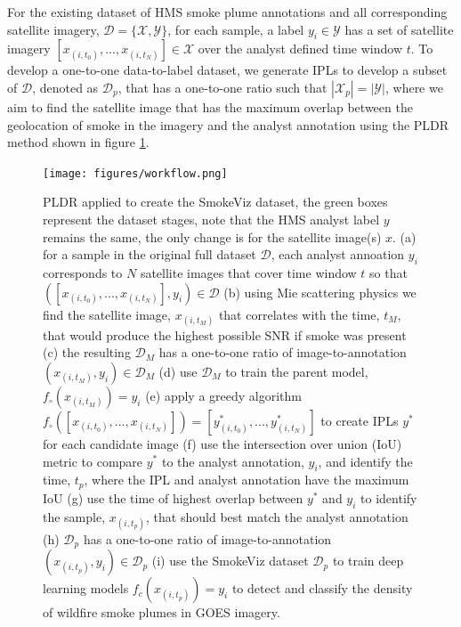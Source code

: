 \documentclass{article}
\begin{document}
For the existing dataset of HMS smoke plume annotations and all corresponding satellite imagery, \(\mathcal{D} = \{\mathcal{X}, \mathcal{Y}\}\), for each sample, a label \(y_i \in \mathcal{Y}\) has a set of satellite imagery \([x_{(i,t_0)},...,x_{(i,t_N)}] \in \mathcal{X}\) over the analyst defined time window \(t\). To develop a one-to-one data-to-label dataset, we generate IPLs to develop a subset of \(\mathcal{D}\), denoted as \(\mathcal{D}_p\), that has a one-to-one ratio such that \(|\mathcal{X}_p| = |\mathcal{Y}|\), where we aim to find the satellite image that has the maximum overlap between the geolocation of smoke in the imagery and the analyst annotation using the PLDR method shown in figure \ref{PLDR}.

\begin{figure}[!htb]
    \centering
    \texttt{[image: figures/workflow.png]}
    \caption{PLDR applied to create the SmokeViz dataset, the green boxes represent the dataset stages, note that the HMS analyst label \(y\) remains the same, the only change is for the satellite image(s) \(x\). (a) for a sample in the original full dataset \(\mathcal{D}\), each analyst annoation \(y_i\) corresponds to \(N\) satellite images that cover time window \(t\) so that \(([x_{(i,t_0)},...,x_{(i,t_N)}], y_i) \in \mathcal{D}\) (b) using Mie scattering physics we find the satellite image, \(x_{(i,t_M)}\) that correlates with the time, \(t_M\), that would produce the highest possible SNR if smoke was present (c) the resulting \(\mathcal{D}_M\) has a one-to-one ratio of image-to-annotation \((x_{(i,t_M)}, y_i) \in \mathcal{D}_M\) (d) use \(\mathcal{D}_M\) to train the parent model, \(f_\circ(x_{(i,t_M)})=y_i\) (e) apply a greedy algorithm \(f_\circ([x_{(i,t_0)},...,x_{(i,t_N)}])=[y^*_{(i,t_0)},...,y^*_{(i,t_N)}]\) to create IPLs \(y^*\) for each candidate image (f) use the intersection over union (IoU) metric to compare \(y^*\) to the analyst annotation, \(y_i\), and identify the time, \(t_p\), where the IPL and analyst annotation have the maximum IoU (g) use the time of highest overlap between \(y^*\) and \(y_i\) to identify the sample, \(x_{(i,t_p)}\), that should best match the analyst annotation (h) \(\mathcal{D}_p\) has a one-to-one ratio of image-to-annotation \((x_{(i,t_p)}, y_i) \in \mathcal{D}_p\) (i) use the SmokeViz dataset \(\mathcal{D}_p\) to train deep learning models \(f_c(x_{(i,t_p)})=y_i\) to detect and classify the density of wildfire smoke plumes in GOES imagery.}\label{PLDR}
\end{figure}
\end{document}

